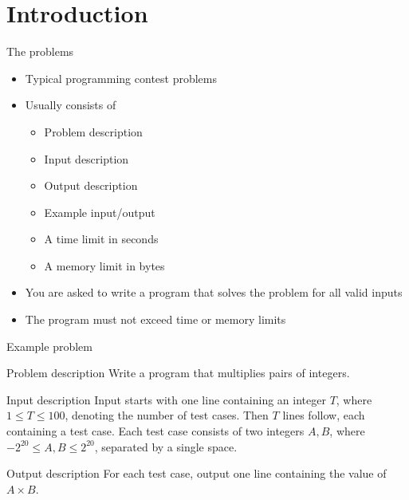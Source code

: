 \documentclass[10pt]{beamer}
\newcommand{\bi}{\begin{itemize}}
\newcommand{\ei}{\end{itemize}}
\begin{document}
\section{Introduction}
\begin{frame}{The problems}
    \bi
        \item Typical programming contest problems
        \item Usually consists of
            \bi
                \item Problem description
                \item Input description
                \item Output description
                \item Example input/output
                \item A time limit in seconds
                \item A memory limit in bytes
            \ei
        \item You are asked to write a program that solves the problem for all valid inputs
        \item The program must not exceed time or memory limits
    \ei
\end{frame}

\begin{frame}{Example problem}
    \begin{block}{Problem description}
    Write a program that multiplies pairs of integers.
    \end{block}

    \vspace{10pt}

    \begin{block}{Input description}
    Input starts with one line containing an integer $T$, where $1\leq T \leq
    100$, denoting the number of test cases. Then $T$ lines follow, each
    containing a test case. Each test case consists of two integers $A,B$,
    where $-2^{20} \leq A,B \leq 2^{20}$, separated by a single space.
    \end{block}

    \vspace{10pt}

    \begin{block}{Output description}
    For each test case, output one line containing the value of $A\times B$.
    \end{block}
\end{frame}
\end{document}
